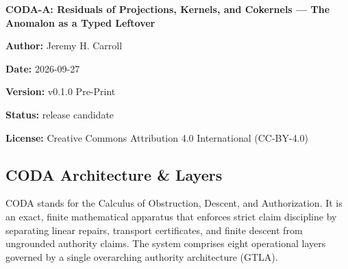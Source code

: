 \documentclass[
  11pt,
]{article}
\begin{document}
\begin{center}
{\Large\bfseries CODA-A: Residuals of Projections, Kernels, and Cokernels --- The Anomalon as a Typed Leftover}\par

\textbf{Author:} Jeremy H. Carroll

\textbf{Date:} 2026-09-27

\textbf{Version:} v0.1.0 Pre-Print

\textbf{Status:} release candidate

\textbf{License:} Creative Commons Attribution 4.0 International (CC-BY-4.0)

\end{center}

\subsection{CODA Architecture \& Layers}\label{coda-architecture-layers}

CODA stands for the Calculus of Obstruction, Descent, and Authorization. It is an exact, finite mathematical apparatus that enforces strict claim discipline by separating linear repairs, transport certificates, and finite descent from ungrounded authority claims. The system comprises eight operational layers governed by a single overarching authority architecture (GTLA).
\end{document}

